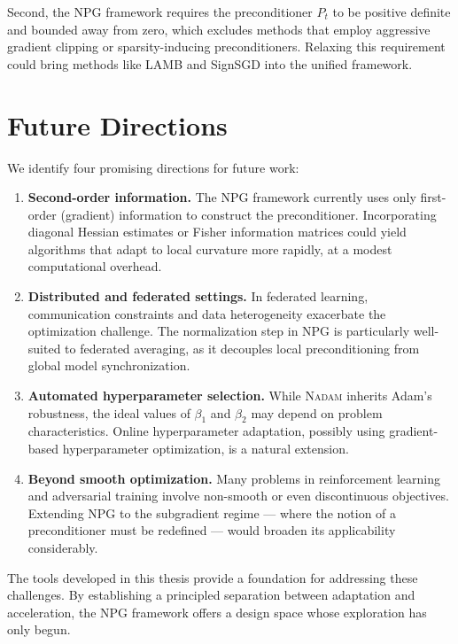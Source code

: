\documentclass[11pt,twoside,openright]{book}
\begin{document}
Second, the NPG framework requires the preconditioner $P_t$ to be positive definite and
bounded away from zero, which excludes methods that employ aggressive gradient clipping or
sparsity-inducing preconditioners. Relaxing this requirement could bring methods like LAMB
\cite{you2020} and SignSGD \cite{bernstein2018} into the unified framework.

\section{Future Directions}

We identify four promising directions for future work:

\begin{enumerate}[leftmargin=2em]
  \item \textbf{Second-order information.} The NPG framework currently uses only first-order
    (gradient) information to construct the preconditioner. Incorporating diagonal Hessian
    estimates or Fisher information matrices could yield algorithms that adapt to local
    curvature more rapidly, at a modest computational overhead.

  \item \textbf{Distributed and federated settings.} In federated learning, communication
    constraints and data heterogeneity exacerbate the optimization challenge. The normalization
    step in NPG is particularly well-suited to federated averaging, as it decouples local
    preconditioning from global model synchronization.

  \item \textbf{Automated hyperparameter selection.} While \textsc{Nadam} inherits Adam's
    robustness, the ideal values of $\beta_1$ and $\beta_2$ may depend on problem
    characteristics. Online hyperparameter adaptation, possibly using gradient-based
    hyperparameter optimization, is a natural extension.

  \item \textbf{Beyond smooth optimization.} Many problems in reinforcement learning and
    adversarial training involve non-smooth or even discontinuous objectives. Extending NPG
    to the subgradient regime — where the notion of a preconditioner must be redefined — would
    broaden its applicability considerably.
\end{enumerate}

The tools developed in this thesis provide a foundation for addressing these challenges. By
establishing a principled separation between adaptation and acceleration, the NPG framework
offers a design space whose exploration has only begun.
\end{document}

